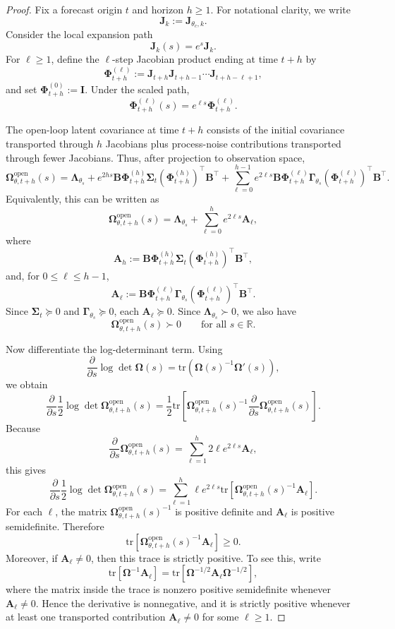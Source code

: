 \documentclass[10pt,a4paper]{amsart}
\newcommand{\tr}{\mathrm{tr}}
\begin{document}
\begin{proof}

Fix a forecast origin $t$ and horizon $h\ge1$. For notational clarity, we write
\[
\bm J_k:=\bm J_{\theta_c,k}.
\]
Consider the local expansion path
\[
\bm J_k(s)=e^s\bm J_k.
\]
For $\ell\ge1$, define the $\ell$-step Jacobian product ending at time $t+h$ by
\[
\bm\Phi^{(\ell)}_{t+h}:=\bm J_{t+h}\bm J_{t+h-1}\cdots \bm J_{t+h-\ell+1},
\]
and set $\bm\Phi^{(0)}_{t+h}:=\bm I$. Under the scaled path,
\[
\bm\Phi^{(\ell)}_{t+h}(s)
=
e^{\ell s}\bm\Phi^{(\ell)}_{t+h}.
\]

The open-loop latent covariance at time $t+h$ consists of the initial covariance
transported through $h$ Jacobians plus process-noise contributions transported
through fewer Jacobians. Thus, after projection to observation space,
\[
\bm\Omega^{\mathrm{open}}_{\theta,t+h}(s)
=
\bm\Lambda_{\theta_s}
+
e^{2hs}
\bm B\bm\Phi^{(h)}_{t+h}\bm\Sigma_t
(\bm\Phi^{(h)}_{t+h})^\top\bm B^\top
+
\sum_{\ell=0}^{h-1}
e^{2\ell s}
\bm B\bm\Phi^{(\ell)}_{t+h}
\bm\Gamma_{\theta_s}
(\bm\Phi^{(\ell)}_{t+h})^\top\bm B^\top .
\]
Equivalently, this can be written as
\[
\bm\Omega^{\mathrm{open}}_{\theta,t+h}(s)
=
\bm\Lambda_{\theta_s}
+
\sum_{\ell=0}^{h} e^{2\ell s}\bm A_\ell,
\]
where
\[
\bm A_h
:=
\bm B\bm\Phi^{(h)}_{t+h}\bm\Sigma_t
(\bm\Phi^{(h)}_{t+h})^\top\bm B^\top,
\]
and, for $0\le \ell\le h-1$,
\[
\bm A_\ell
:=
\bm B\bm\Phi^{(\ell)}_{t+h}
\bm\Gamma_{\theta_s}
(\bm\Phi^{(\ell)}_{t+h})^\top\bm B^\top .
\]
Since $\bm\Sigma_t\succeq0$ and $\bm\Gamma_{\theta_s}\succeq0$, each
$\bm A_\ell\succeq0$. Since $\bm\Lambda_{\theta_s}\succ0$, we also have
\[
\bm\Omega^{\mathrm{open}}_{\theta,t+h}(s)\succ0
\qquad
\text{for all }s\in\mathbb R.
\]

Now differentiate the log-determinant term. Using
\[
\frac{\partial}{\partial s}\log\det \bm\Omega(s)
=
\tr \left(\bm\Omega(s)^{-1}\bm\Omega'(s)\right),
\]
we obtain
\[
\frac{\partial}{\partial s}
\frac12\log\det\bm\Omega^{\mathrm{open}}_{\theta,t+h}(s)
=
\frac12
\tr \left[
\bm\Omega^{\mathrm{open}}_{\theta,t+h}(s)^{-1}
\frac{\partial}{\partial s}\bm\Omega^{\mathrm{open}}_{\theta,t+h}(s)
\right].
\]
Because
\[
\frac{\partial}{\partial s}\bm\Omega^{\mathrm{open}}_{\theta,t+h}(s)
=
\sum_{\ell=1}^{h}
2\ell e^{2\ell s}\bm A_\ell,
\]
this gives
\[
\frac{\partial}{\partial s}
\frac12\log\det\bm\Omega^{\mathrm{open}}_{\theta,t+h}(s)
=
\sum_{\ell=1}^{h}
\ell e^{2\ell s}
\tr \left[
\bm\Omega^{\mathrm{open}}_{\theta,t+h}(s)^{-1}
\bm A_\ell
\right].
\]
For each $\ell$, the matrix
$\bm\Omega^{\mathrm{open}}_{\theta,t+h}(s)^{-1}$ is positive definite and
$\bm A_\ell$ is positive semidefinite. Therefore
\[
\tr \left[
\bm\Omega^{\mathrm{open}}_{\theta,t+h}(s)^{-1}
\bm A_\ell
\right]\ge0.
\]
Moreover, if $\bm A_\ell\neq0$, then this trace is strictly positive. To see
this, write
\[
\tr \left[
\bm\Omega^{-1}\bm A_\ell
\right]
=
\tr \left[
\bm\Omega^{-1/2}\bm A_\ell\bm\Omega^{-1/2}
\right],
\]
where the matrix inside the trace is nonzero positive semidefinite whenever
$\bm A_\ell\neq0$. Hence the derivative is nonnegative, and it is strictly
positive whenever at least one transported contribution $\bm A_\ell\neq0$ for
some $\ell\ge1$.


\end{proof}
\end{document}
